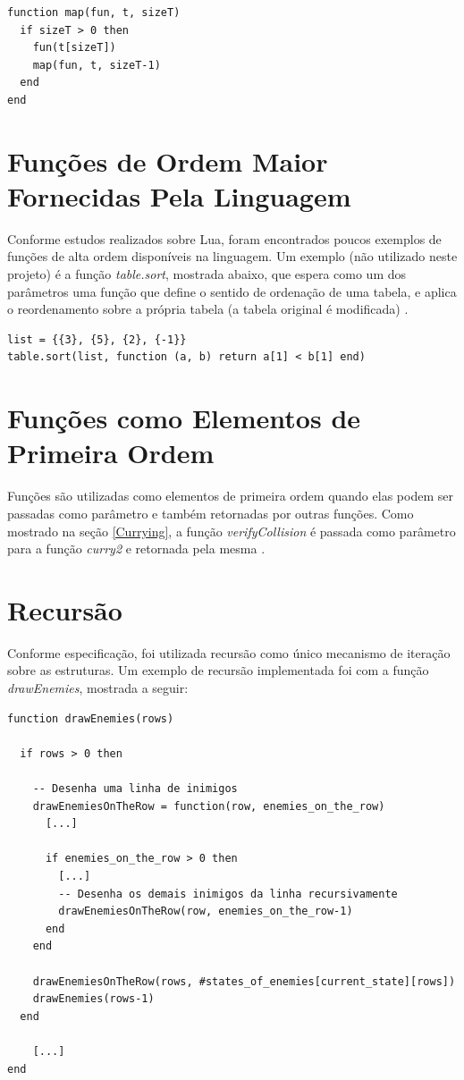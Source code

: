 \documentclass[rel_mlp]{iiufrgs}
\begin{document}
\begin{lstlisting}
function map(fun, t, sizeT)
  if sizeT > 0 then
    fun(t[sizeT])
    map(fun, t, sizeT-1)
  end
end
\end{lstlisting}

\section{Funções de Ordem Maior Fornecidas Pela Linguagem}

Conforme estudos realizados sobre Lua, foram encontrados poucos exemplos de funções de alta ordem disponíveis na linguagem. Um exemplo (não utilizado neste projeto) é a função \textit{table.sort}, mostrada abaixo, que espera como um dos parâmetros uma função que define o sentido de ordenação de uma tabela, e aplica o reordenamento sobre a própria tabela (a tabela original é modificada) \cite{FunctionsLua}.

\begin{lstlisting}
list = {{3}, {5}, {2}, {-1}}
table.sort(list, function (a, b) return a[1] < b[1] end)
\end{lstlisting}

\section{Funções como Elementos de Primeira Ordem}

Funções são utilizadas como elementos de primeira ordem quando elas podem ser passadas como parâmetro e também retornadas por outras funções. Como mostrado na seção \ref{Currying}, a função \textit{verifyCollision} é passada como parâmetro para a função \textit{curry2} e retornada pela mesma \cite{FunctionsLua}.

\section{Recursão}

Conforme especificação, foi utilizada recursão como único mecanismo de iteração sobre as estruturas. Um exemplo de recursão implementada foi com a função \textit{drawEnemies}, mostrada a seguir:

\begin{lstlisting}
function drawEnemies(rows)

  if rows > 0 then
  
    -- Desenha uma linha de inimigos
    drawEnemiesOnTheRow = function(row, enemies_on_the_row)      
      [...]

      if enemies_on_the_row > 0 then
        [...]
        -- Desenha os demais inimigos da linha recursivamente
        drawEnemiesOnTheRow(row, enemies_on_the_row-1)
      end
    end
    
    drawEnemiesOnTheRow(rows, #states_of_enemies[current_state][rows])
    drawEnemies(rows-1)
  end
  
  	[...]
end


\end{lstlisting}
\end{document}
